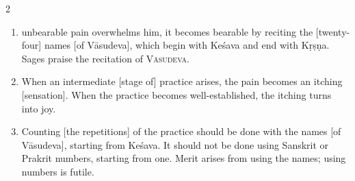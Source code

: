 \begin{nohyp}
\begin{multicols}{2}
\begin{eng}
\begin{enumerate}[nosep]
\item[46.] [If] unbearable pain overwhelms him, it becomes bearable by reciting the [twenty-four] names [of Vāsudeva], which begin with Keśava and end with Kṛṣṇa. Sages praise the recitation of \textsc{Vāsudeva}.
\item[47.] When an intermediate [stage of] practice arises, the pain becomes an itching [sensation]. When the practice becomes well-established, the itching turns into joy.
\item[48.] Counting [the repetitions] of the practice should be done with the names [of Vāsudeva], starting from Keśava. It should not be done using Sanskrit or Prakrit numbers, starting from one. Merit arises from using the names; using numbers is futile.
\end{enumerate}
\vskip 7pt



\end{eng}
\end{multicols}
\end{nohyp}
